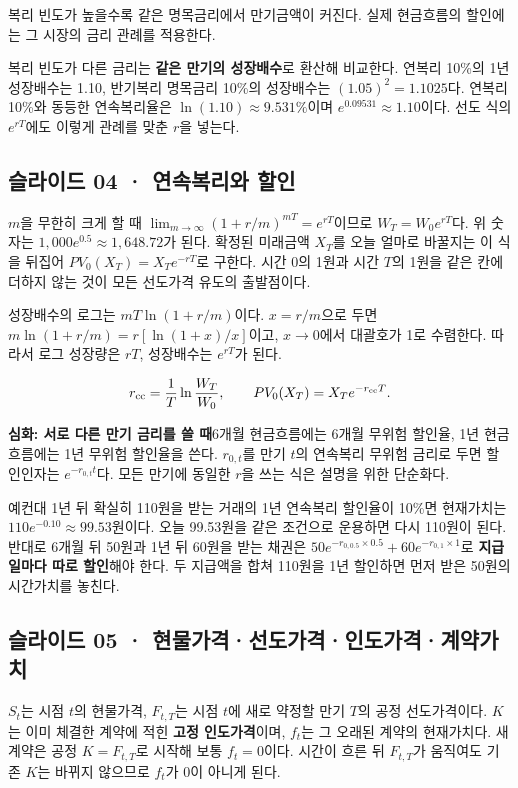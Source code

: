 \documentclass[11pt,a4paper]{article}
\begin{document}
복리 빈도가 높을수록 같은 명목금리에서 만기금액이 커진다. 실제 현금흐름의 할인에는 그 시장의 금리 관례를 적용한다.\par

복리 빈도가 다른 금리는 \textbf{같은 만기의 성장배수}로 환산해 비교한다. 연복리 10\%의 1년 성장배수는 1.10, 반기복리 명목금리 10\%의 성장배수는 $(1.05)^2=1.1025$다. 연복리 10\%와 동등한 연속복리율은 $\ln(1.10)\approx9.531\%$이며 $e^{0.09531}\approx1.10$이다. 선도 식의 $e^{rT}$에도 이렇게 관례를 맞춘 $r$을 넣는다.\par

\subsection{슬라이드 04 · 연속복리와 할인}
$m$을 무한히 크게 할 때 $\lim_{m\to\infty}(1+r/m)^{mT}=e^{rT}$이므로 $W_T=W_0e^{rT}$다. 위 숫자는 $1,000e^{0.5}\approx1,648.72$가 된다. 확정된 미래금액 $X_T$를 오늘 얼마로 바꿀지는 이 식을 뒤집어 $PV_0(X_T)=X_Te^{-rT}$로 구한다. 시간 0의 1원과 시간 $T$의 1원을 같은 칸에 더하지 않는 것이 모든 선도가격 유도의 출발점이다.\par

성장배수의 로그는 $mT\ln(1+r/m)$이다. $x=r/m$으로 두면 $m\ln(1+r/m)=r[\ln(1+x)/x]$이고, $x\to0$에서 대괄호가 1로 수렴한다. 따라서 로그 성장량은 $rT$, 성장배수는 $e^{rT}$가 된다.\par

\[
r_{\rm cc}=\frac{1}{T}\ln\frac{W_T}{W_0},\qquad
PV_0(X_T)=X_Te^{-r_{\rm cc}T}.
\]

\par\medskip\noindent\textbf{심화: 서로 다른 만기 금리를 쓸 때}\quad 6개월 현금흐름에는 6개월 무위험 할인율, 1년 현금흐름에는 1년 무위험 할인율을 쓴다. $r_{0,t}$를 만기 $t$의 연속복리 무위험 금리로 두면 할인인자는 $e^{-r_{0,t}t}$다. 모든 만기에 동일한 $r$을 쓰는 식은 설명을 위한 단순화다.\par

예컨대 1년 뒤 확실히 110원을 받는 거래의 1년 연속복리 할인율이 10\%면 현재가치는 $110e^{-0.10}\approx99.53$원이다. 오늘 99.53원을 같은 조건으로 운용하면 다시 110원이 된다. 반대로 6개월 뒤 50원과 1년 뒤 60원을 받는 채권은 $50e^{-r_{0,0.5}\times0.5}+60e^{-r_{0,1}\times1}$로 \textbf{지급일마다 따로 할인}해야 한다. 두 지급액을 합쳐 110원을 1년 할인하면 먼저 받은 50원의 시간가치를 놓친다.\par

\subsection{슬라이드 05 · 현물가격·선도가격·인도가격·계약가치}
$S_t$는 시점 $t$의 현물가격, $F_{t,T}$는 시점 $t$에 새로 약정할 만기 $T$의 공정 선도가격이다. $K$는 이미 체결한 계약에 적힌 \textbf{고정 인도가격}이며, $f_t$는 그 오래된 계약의 현재가치다. 새 계약은 공정 $K=F_{t,T}$로 시작해 보통 $f_t=0$이다. 시간이 흐른 뒤 $F_{t,T}$가 움직여도 기존 $K$는 바뀌지 않으므로 $f_t$가 0이 아니게 된다.\par
\end{document}
